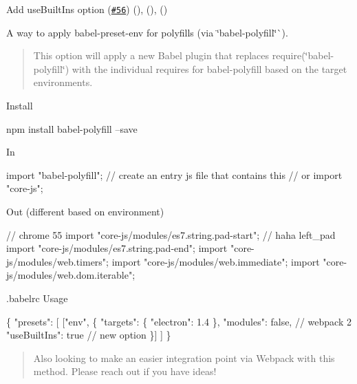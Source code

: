 \begin{DoxyItemize}
\item Add {\ttfamily use\+Built\+Ins} option (\href{https://github.com/babel/babel-preset-env/pull/56}{\tt \#56}) (\href{https://github.com/hzoo}{\tt }), (\href{https://github.com/yavorsky}{\tt }), (\href{https://github.com/existentialism}{\tt })
\end{DoxyItemize}

A way to apply {\ttfamily babel-\/preset-\/env} for polyfills (via {\ttfamily \char`\"{}babel-\/polyfill\char`\"{}}\`{}).

\begin{quote}
This option will apply a new Babel plugin that replaces {\ttfamily require(\char`\"{}babel-\/polyfill\char`\"{})} with the individual requires for {\ttfamily babel-\/polyfill} based on the target environments. \end{quote}


Install


\begin{DoxyCode}
npm install babel-polyfill --save
\end{DoxyCode}


In


\begin{DoxyCode}
import "babel-polyfill"; // create an entry js file that contains this
// or 
import "core-js";
\end{DoxyCode}


Out (different based on environment)


\begin{DoxyCode}
// chrome 55
import "core-js/modules/es7.string.pad-start"; // haha left\_pad
import "core-js/modules/es7.string.pad-end";
import "core-js/modules/web.timers";
import "core-js/modules/web.immediate";
import "core-js/modules/web.dom.iterable";
\end{DoxyCode}


{\ttfamily .babelrc} Usage


\begin{DoxyCode}
\{
  "presets": [
    ["env", \{
      "targets": \{
        "electron": 1.4
      \},
      "modules": false, // webpack 2
      "useBuiltIns": true // new option
    \}]
  ]
\}
\end{DoxyCode}


\begin{quote}
Also looking to make an easier integration point via Webpack with this method. Please reach out if you have ideas! \end{quote}





